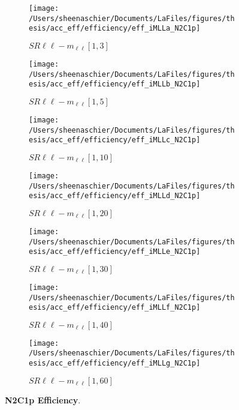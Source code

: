 \begin{figure}
        \centering
    \begin{subfigure}[b]{0.44\textwidth}
        \texttt{[image: /Users/sheenaschier/Documents/LaFiles/figures/thesis/acc\_eff/efficiency/eff\_iMLLa\_N2C1p]}
    \caption{$SR\ell\ell-m_{\ell\ell} [1, 3]$}
    \end{subfigure}
    \begin{subfigure}[b]{0.44\textwidth}
        \texttt{[image: /Users/sheenaschier/Documents/LaFiles/figures/thesis/acc\_eff/efficiency/eff\_iMLLb\_N2C1p]}
    \caption{$SR\ell\ell-m_{\ell\ell} [1, 5]$}
    \end{subfigure}
    \begin{subfigure}[b]{0.44\textwidth}
        \texttt{[image: /Users/sheenaschier/Documents/LaFiles/figures/thesis/acc\_eff/efficiency/eff\_iMLLc\_N2C1p]}
    \caption{$SR\ell\ell-m_{\ell\ell} [1, 10]$}
    \end{subfigure}
    \begin{subfigure}[b]{0.44\textwidth}
        \texttt{[image: /Users/sheenaschier/Documents/LaFiles/figures/thesis/acc\_eff/efficiency/eff\_iMLLd\_N2C1p]}
    \caption{$SR\ell\ell-m_{\ell\ell} [1, 20]$}
    \end{subfigure}
    \begin{subfigure}[b]{0.44\textwidth}
        \texttt{[image: /Users/sheenaschier/Documents/LaFiles/figures/thesis/acc\_eff/efficiency/eff\_iMLLe\_N2C1p]}
    \caption{$SR\ell\ell-m_{\ell\ell} [1, 30]$}
    \end{subfigure}
    \begin{subfigure}[b]{0.44\textwidth}
        \texttt{[image: /Users/sheenaschier/Documents/LaFiles/figures/thesis/acc\_eff/efficiency/eff\_iMLLf\_N2C1p]}
    \caption{$SR\ell\ell-m_{\ell\ell} [1, 40]$}
    \end{subfigure}
    \begin{subfigure}[b]{0.44\textwidth}
        \texttt{[image: /Users/sheenaschier/Documents/LaFiles/figures/thesis/acc\_eff/efficiency/eff\_iMLLg\_N2C1p]}
    \caption{$SR\ell\ell-m_{\ell\ell} [1, 60]$}
    \end{subfigure}
    \caption{\textbf{N2C1p Efficiency}.}
\end{figure}

